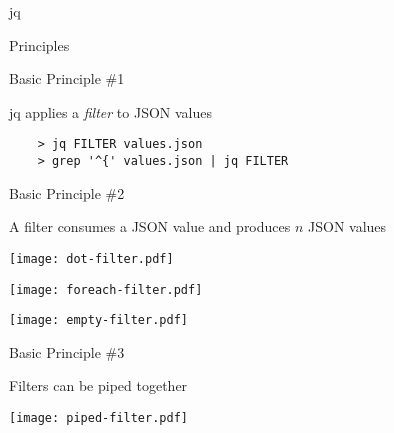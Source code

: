 \documentclass{beamer}
\renewcommand\big[1]{
  \begin{center}
    \Large{#1}
  \end{center}
}
\begin{document}
\begin{frame}
  \centering\Huge{jq}
\end{frame}

\begin{frame}
  \centering\Huge{Principles}
\end{frame}

\begin{frame}[fragile]
  \big{Basic Principle \#1}

  \begin{center}
    jq applies a \textit{filter} to JSON values
  \end{center}

  \begin{lstlisting}
    > jq FILTER values.json
    > grep '^{' values.json | jq FILTER
  \end{lstlisting}
\end{frame}

\begin{frame}
  \big{Basic Principle \#2}

  \begin{center}
    A filter consumes a JSON value and produces $n$ JSON values
  \end{center}

  \begin{center}
    \begin{minipage}{.3\textwidth}
      \texttt{[image: dot-filter.pdf]}
    \end{minipage}
    \begin{minipage}{.3\textwidth}
      \texttt{[image: foreach-filter.pdf]}
    \end{minipage}
    \begin{minipage}{.3\textwidth}
      \texttt{[image: empty-filter.pdf]}
    \end{minipage}
  \end{center}
\end{frame}

\begin{frame}[fragile]
  \big{Basic Principle \#3}

  \begin{center}
    Filters can be piped together
  \end{center}

  \begin{center}
    \texttt{[image: piped-filter.pdf]}
  \end{center}
\end{frame}
\end{document}
